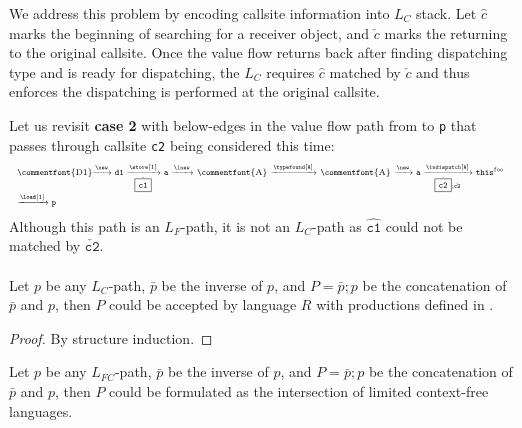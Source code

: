 We address this problem by encoding callsite information into $L_C$ stack. Let $\hat{\boxed{c}}$ marks the beginning of searching for a receiver object, and $\check{\boxed{c}}$ marks the returning to the original callsite. Once the value flow returns back after finding dispatching type and is ready for dispatching, the $L_C$ requires $\hat{\boxed{c}}$ matched by $\check{\boxed{c}}$ and thus enforces the dispatching is performed at the original callsite. 

Let us revisit \textbf{case 2} with below-edges in the value flow path from  to \texttt{p} that passes through callsite \texttt{c2} being considered this time:
\begin{equation} \scriptsize
  \centering
\label{eq:CH3Case2}
\begin{tabular}{l} 
\commentfont{D1}$\xrightarrow{\new}
\texttt{d1}\xrightarrow[\hat{\boxed{\texttt{c1}}}]{\store[1]}
\texttt{a} \xrightarrow{\inew}$ 
\commentfont{A} $\xrightarrow{\typefound[\texttt{A}]}$ \commentfont{A}
$ \xrightarrow{\new} \texttt{a}\xrightarrow[\check{\boxed{\texttt{c2}}};\hat{\texttt{c2}}]{\indispatch[\texttt{A}]} \texttt{this}^{\texttt{foo}}$\\
\scriptsize
$\xrightarrow{\load[1]}\texttt{p}
$
\end{tabular}
\end{equation}
Although this path is an $L_F$-path, it is not an $L_C$-path as $\hat{\boxed{\texttt{c1}}}$ could not be matched by $\check{\boxed{\texttt{c2}}}$.

\paragraph{ } 

\begin{theorem} \label{theorem:CSRecoveryPath}
Let $p$ be any $L_{C}$-path, $\bar{p}$ be the inverse of $p$, and $P = \bar{p};p$ be the concatenation of $\bar{p}$ and $p$, then $P$ could be accepted by language $R$ with productions defined in . 
\end{theorem}
\begin{proof}
By structure induction.
\end{proof}

\begin{corollary} \label{theorem:LFCRecoveryPath}
Let $p$ be any $L_{FC}$-path, $\bar{p}$ be the inverse of $p$, and $P = \bar{p};p$ be the concatenation of $\bar{p}$ and $p$, then $P$ could be formulated as the intersection of limited context-free languages.
\end{corollary}




